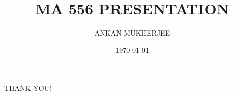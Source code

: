 \documentclass{beamer}
\title{MA 556 PRESENTATION}
\author{ANKAN MUKHERJEE}
\institute{IIT BOMBAY}
\date{\today}
\begin{document}
\frame{\titlepage}






\begin{frame}
\begin{center}
THANK YOU!
\end{center}
\end{frame}
\end{document}
